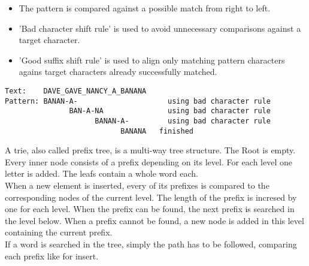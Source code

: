\documentclass[10pt,a4paper]{scrartcl}
\begin{document}
\begin{itemize}
  \item The pattern is compared against a possible match from right to left.
  \item 'Bad character shift rule' is used to avoid unnecessary comparisons against a target character.
  \item 'Good suffix shift rule' is used to align only matching pattern characters agains target characters already successfully matched.
\end{itemize}



\begin{lstlisting}
Text:    DAVE_GAVE_NANCY_A_BANANA
Pattern: BANAN-A-                     using bad character rule
               BAN-A-NA               using bad character rule
                     BANAN-A-         using bad character rule
                           BANANA   finished
\end{lstlisting}



A trie, also called prefix tree, is a multi-way tree structure. The Root is empty. Every inner node consists of a prefix depending on its level. For each level one letter is added. The leafs contain a whole word each.\\
When a new element is inserted, every of its prefixes is compared to the corresponding nodes of the current level. The length of the prefix is incresed by one for each level. When the prefix can be found, the next prefix is searched in the level below. When a prefix cannot be found, a new node is added in this level containing the current prefix.\\
If a word is searched in the tree, simply the path has to be followed, comparing each prefix like for insert.
\end{document}
